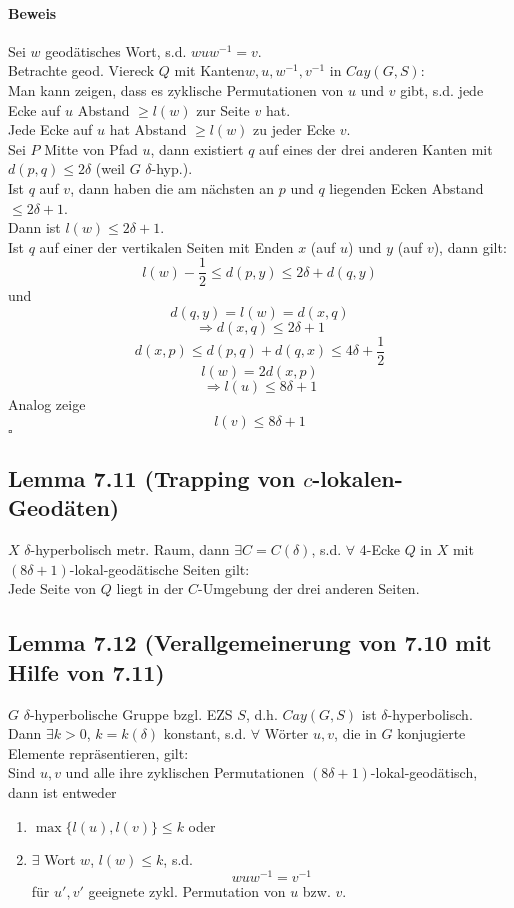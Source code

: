 \documentclass{article}
\newcommand{\qed}{\hfill $\square$}
\begin{document}
\paragraph{Beweis}
Sei $w$ geodätisches Wort, s.d. $wuw^{-1} = v$.\\
Betrachte geod. Viereck $Q $ mit Kanten$ w,u, w^{-1},v^{-1}$ in $Cay(G,S)$:\\
Man kann zeigen, dass es zyklische Permutationen von $u$ und $v$ gibt, s.d. jede Ecke auf $u$ Abstand $\geq l(w)$ zur Seite $v$ hat.\\
Jede Ecke auf $u$ hat Abstand $\geq l(w)$ zu jeder Ecke $v$.\\
Sei $P$ Mitte von Pfad $u$, dann existiert $q$ auf eines der drei anderen Kanten mit $d(p,q) \leq 2\delta$ (weil $G$ $\delta$-hyp.).\\
Ist $q$ auf $v$, dann haben die am nächsten an $p$ und $q$ liegenden Ecken Abstand $\leq 2\delta + 1$.\\
Dann ist $l(w) \leq 2\delta + 1$.\\
Ist $q$ auf einer der vertikalen Seiten mit Enden $x$ (auf $u$) und $y$ (auf $v$), dann gilt:
\[ l(w) - \frac{1}{2} \leq d(p,y) \leq 2\delta + d(q,y)  \]
und
\[ d(q,y) = l(w) = d(x,q) \]
\[\Longrightarrow d(x,q)  \leq 2\delta + 1 \]
\[ d(x,p)  \leq d(p,q) + d(q,x) \leq 4\delta + \frac{1}{2} \]
\[l(w) = 2d(x,p) \]
\[ \Longrightarrow l(u) \leq 8\delta + 1 \]
Analog zeige
\[l(v) \leq 8\delta + 1 \]
\qed


\subsection{Lemma 7.11 (Trapping von $c$-lokalen-Geodäten)}
$X$ $\delta$-hyperbolisch metr. Raum, dann $\exists C = C(\delta)$, s.d. $\forall$ 4-Ecke $Q$ in $X$ mit $(8\delta + 1)$-lokal-geodätische Seiten gilt:\\
Jede Seite von $Q$ liegt in der $C$-Umgebung der drei anderen Seiten.

\subsection{Lemma 7.12 (Verallgemeinerung von 7.10 mit Hilfe von 7.11)}
$G$ $\delta$-hyperbolische Gruppe bzgl. EZS $S$, d.h. $Cay(G,S)$ ist $\delta$-hyperbolisch.\\
Dann $\exists k > 0$, $k = k(\delta)$ konstant, s.d. $\forall$ Wörter $u,v$, die in $G$ konjugierte Elemente repräsentieren, gilt:\\
Sind $u,v$ und alle ihre zyklischen Permutationen $(8\delta + 1)$-lokal-geodätisch, dann ist entweder
\begin{enumerate}
	\item $\max\{ l(u),l(v) \} \leq k$ oder
	\item $\exists $ Wort $w$, $l(w) \leq k$, s.d.
	\[wuw^{-1} =v^{-1} \]
	für $u',v'$ geeignete zykl. Permutation von $u$ bzw. $v$.
\end{enumerate}
\end{document}
